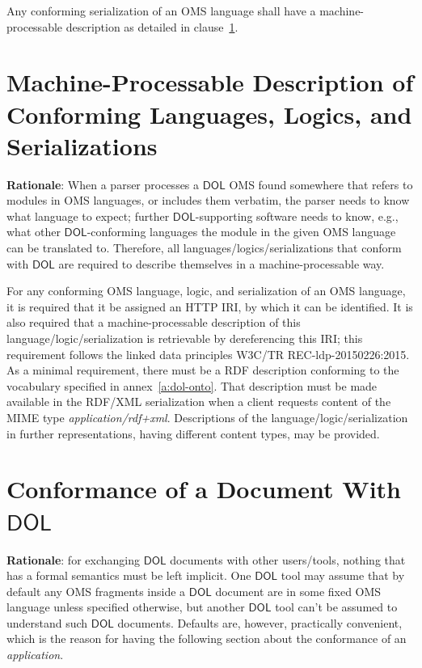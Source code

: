 \documentclass[10pt,fleqn,final]{scrreprt}
\makeatletter
\newcommand*{\eg}{e.g.\@\xspace}
\newcommand*\CommentAuthor{}
\renewcommand*\CommentAuthor{#1}}
\newcommand*\CommentDate{}
\renewcommand*\CommentDate{#1}}
\newcommand*\CommentId{}
\renewcommand*\CommentId{#1}}
\newcommand*\CommentType{}
\renewcommand*\CommentType{#1}}
\newcommand*{\SetCommentColorByType}[1]{%
\edef\localType{{#1}}%
\expandafter\ifstrequal\localType{q-aut}{\colorlet{CommentColor}{red}}{%
\expandafter\ifstrequal\localType{q-all}{\colorlet{CommentColor}{orange}}{%
\expandafter\ifstrequal\localType{todo}{\colorlet{CommentColor}{orange}}{%
\expandafter\ifstrequal\localType{fyi}{\colorlet{CommentColor}{lightgray}}{%
\colorlet{CommentColor}{yellow}}}}}}
\newcommand*{\SetCommentPrefixByType}[1]{%
\edef\localType{{#1}}%
\expandafter\@ifmtarg\localType{%
\edef\CommentPrefix{}%
}{%
\caseupper[q]{#1}%
\edef\CommentPrefix{\thestring: }%
}}
\newcommand*{\initComment}[1]{%
\setkeys{Comment}{#1}%
\SetCommentColorByType{\CommentType}%
\relax%
\SetCommentPrefixByType{\CommentType}%
\relax%
}
\newcommand*{\todonote}[2][]{%
\initComment{#1}%
\pdfcomment[author=\CommentAuthor,color=CommentColor,date=\CommentDate,id=\CommentId]{%
\CommentPrefix
#2}}
\renewcommand*{\todonote}[2][]{%
\initComment{#1}%
\ednote{\CommentPrefix #2}}
\newcommand*{\CLnote}[2][author=Christoph Lange]{%
\todonote[author=Christoph Lange,#1]{#2} 
}
\newcommand*{\mimetype}[1]{\textit{#1}}
\newcommand*{\DOL}{\ensuremath{\mathsf{DOL}}\xspace}
\newcommand{\annexrefname}{annex}
\newcommand{\clauserefname}{clause}
\newcommand{\aref}[1]{\annexrefname~\ref{#1}}
\newcommand{\cref}[1]{\clauserefname~\ref{#1}}
\newcommand{\sclause}[1]{\section{#1}}
\newcommand{\nisref}[1]{#1}
\makeatother
\begin{document}
Any conforming serialization of an OMS language shall have a machine-processable description as detailed in \cref{c:conform:description}.

\sclause{Machine-Processable Description of Conforming Languages, Logics, and Serializations}\label{c:conform:description}

\begin{fminipage}{\textwidth}
\textbf{Rationale}: When a parser processes a \DOL OMS found somewhere that refers to modules in OMS languages, or includes them verbatim, the parser needs to know what language to expect; further \DOL-supporting software needs to know, e.g., what other \DOL-conforming languages the module in the given OMS language can be translated to.  Therefore,   all languages/logics/serializations that conform with \DOL are required to describe themselves in a machine-processable way.

\end{fminipage}

For any conforming OMS language, logic, and serialization of an OMS language, it is required that it be assigned an HTTP IRI, by which it can be identified.  It is also required that a machine-processable description of this language/logic/serialization is retrievable by dereferencing this IRI; this requirement follows the linked data principles \nisref{W3C/TR REC-ldp-20150226:2015}. 
 As a minimal requirement, there must be a RDF description conforming to the vocabulary specified in \aref{a:dol-onto}. That description must be made available in the RDF/XML serialization when a client requests content of the MIME type \mimetype{application/rdf+xml}.  Descriptions of the language/logic/serialization in further representations, having different content types, may be provided.%


\sclause{Conformance of a Document With \DOL}\label{c:conform:document}
\begin{fminipage}{\textwidth}
\textbf{Rationale}: for exchanging \DOL documents with other users/tools, nothing that has a formal semantics
must be left implicit.  One \DOL tool may assume that by default any OMS fragments inside a \DOL
document are in some fixed OMS language unless specified otherwise, but another \DOL tool can't be
assumed to understand such \DOL documents.  Defaults are, however, practically convenient, which is
the reason for having the following section about the conformance of an \emph{application}.
\end{fminipage}
\end{document}
